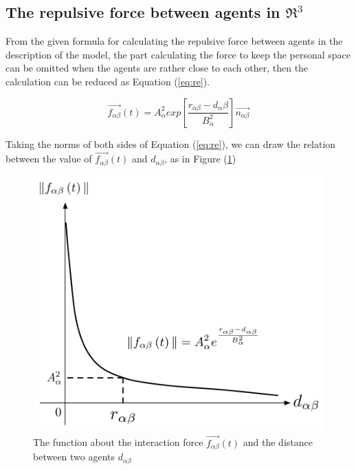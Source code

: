 \subsection{The repulsive force between agents in $ \Re ^{3}$}
From the given formula for calculating the repulsive force between agents in the description of the model, the part calculating the force to keep the personal space can be omitted when the agents are rather close to each other, then the calculation can be reduced as Equation (\ref{eq:re}).

\begin{equation}\label{eq:re}
\overrightarrow{f_{\alpha\beta}}(t) = A_{\alpha}^{2} exp\left[ \frac{r_{\alpha\beta} - d_{\alpha}\beta}{B_{\alpha}^{2}}\right]  \overrightarrow{n_{\alpha\beta}}
\end{equation}

Taking the norms of both sides of Equation (\ref{eq:re}), we can draw the relation between the value of 
$\overrightarrow{f_{\alpha\beta}}(t)$ and $d_{\alpha \beta}$, as in Figure (\ref{fig:physicalinteraction})
\\
\begin{figure}
\centering
\includegraphics[scale=0.45]{Figures/physicalinteraction.pdf} 
\caption{The function about the interaction force $\vec{f_{\alpha\beta}}(t)$ and the distance between two agents
$d_{\alpha\beta}$ }\label{fig:physicalinteraction}
\end{figure}

